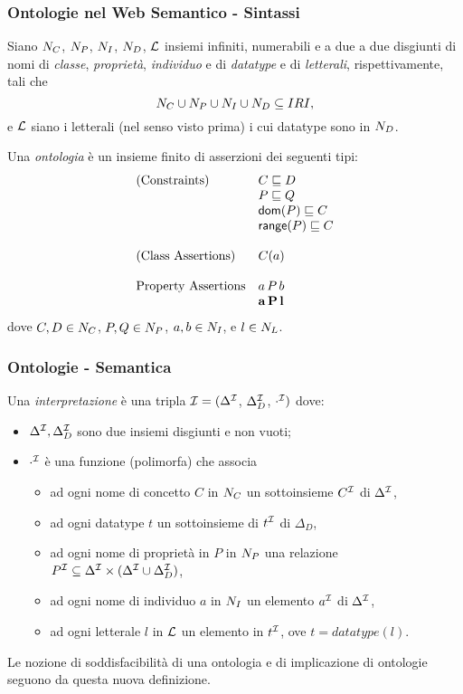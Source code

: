 \documentclass[8pt]{beamer}
\begin{document}
\begin{frame}
 \frametitle{Ontologie nel Web Semantico - Sintassi}

Siano $N_C$, $N_P$, $N_I$, $N_D$, $\mathcal{L}$ insiemi
infiniti, numerabili e a due a due disgiunti di nomi di \emph{classe}, \emph{propriet\`a},
\emph{individuo} e di  \emph{datatype} e di \emph{letterali}, rispettivamente,
tali che
\[
	N_C \cup N_P \cup N_I \cup N_D \subseteq IRI , 
\]
e $\mathcal{L}$ siano i letterali (nel senso visto prima) i cui datatype
sono in $N_D$.

Una \emph{ontologia} \`e un insieme finito di asserzioni dei seguenti tipi:
\[
 \begin{array}{ll}
  \mbox{(Constraints)} & C \sqsubseteq D\\
  & P \sqsubseteq Q \\
  & \mathsf{dom}(P) \sqsubseteq C \\
  & \mathsf{range}(P) \sqsubseteq C \\
  &\\
  \mbox{(Class Assertions)} & C(a)\\
  &\\
  \mbox{Property Assertions} & a\,P\,b\\
  & \mathbf{a\,P\,l}\\
 \end{array}
\]
dove $C, D \in N_C$, $P, Q \in N_P$, $a, b \in N_I$,
e $l \in N_L$.
\end{frame}

\begin{frame}
 \frametitle{Ontologie - Semantica}
Una \emph{interpretazione} \`e una
tripla $\mathcal{I}=(\Delta^{\mathcal{I}}$, $\Delta_{D}^{\mathcal{I}}$, $\cdot^{\mathcal{I}})$ dove:
\begin{itemize}
 \item $\Delta^{\mathcal{I}}, \Delta_{D}^{\mathcal{I}}$ sono due insiemi disgiunti e non vuoti;
 \item $\cdot^{\mathcal{I}}$ \`e una funzione (polimorfa) che associa
 \begin{itemize}
  \item ad ogni nome di concetto $C$ in $N_C$ un sottoinsieme $C^{\mathcal{I}}$ di
  $\Delta^{\mathcal{I}}$,
  \item ad ogni datatype $t$ un sottoinsieme di $t^{\mathcal{I}}$ di $\Delta_{D}$, 
  \item ad ogni nome di propriet\`a in $P$ in $N_P$ una relazione 
  $P^{\mathcal{I}} \subseteq \Delta^{\mathcal{I}} \times (\Delta^{\mathcal{I}} \cup \Delta_D^{\mathcal{I}})$,
  \item ad ogni nome di individuo $a$ in $N_I$ un elemento $a^{\mathcal{I}}$ di
  $\Delta^{\mathcal{I}}$,
  \item ad ogni letterale $l$ in $\mathcal{L}$ un elemento in $t^{\mathcal{I}}$, ove
  $t=datatype(l)$.
 \end{itemize}
\end{itemize}

Le nozione di soddisfacibilit\`a di una ontologia e di implicazione di 
ontologie seguono da questa nuova definizione.
\end{frame}
\end{document}
